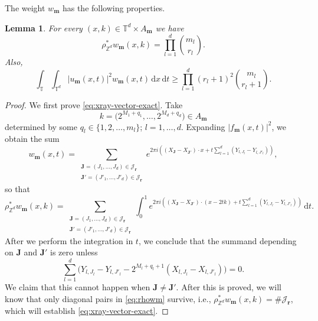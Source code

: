 \documentclass[11pt,reqno]{amsart}
\newtheorem{lemma}[theorem]{Lemma}
\numberwithin{equation}{section}
\newcommand{\dd}{\,\mathrm{d}}
\renewcommand{\ge}{\geqslant}
\begin{document}
The weight $w_{\mathbf{m}}$ has the following properties.

\begin{lemma}\label{lm:dyadic-test-estimates}
For every $(x,k)\in\mathbb{T}^d\times A_{\mathbf{m}}$ we have
\begin{equation}\label{eq:xray-vector-exact}
\rho^{\ast}_{\mathbb{Z}^d}w_{\mathbf{m}}(x,k) = \prod_{l=1}^d\binom{m_l}{r_l}.
\end{equation}
Also,
\begin{equation}\label{eq:numerator-vector-lower}
\int_{\mathbb{T}} \int_{\mathbb{T}^d} |u_{\mathbf{m}}(x,t)|^2 w_{\mathbf{m}}(x,t)\dd x\dd t \ge \prod_{l=1}^d (r_l+1)^2\binom{m_l}{r_l+1}.
\end{equation}
\end{lemma}

\begin{proof}
We first prove \eqref{eq:xray-vector-exact}. Take 
\[ k = \bigl(2^{M_1+q_1},\ldots,2^{M_d+q_d}\bigr)\in A_{\mathbf{m}} \]
determined by some $q_l\in\{1,2,\ldots,m_l\}$; $l=1,\ldots,d$. Expanding $|f_{\mathbf{m}}(x,t)|^2$, we obtain the sum
\[ w_{\mathbf{m}}(x,t) = \sum_{\substack{\mathbf{J}=(J_1,\ldots,J_d)\in\mathcal{J}_{\mathbf{r}} \\ \mathbf{J}'=(J'_1,\ldots,J'_d)\in\mathcal{J}_{\mathbf{r}}}} e^{2\pi i\left((X_{\mathbf{J}}-X_{\mathbf{J}'})\cdot x+ t\sum_{l=1}^d(Y_{l,J_l}-Y_{l,J'_l})\right)}, \]
so that
\begin{equation}\label{eq:rhowm}
\rho^{\ast}_{\mathbb{Z}^d}w_{\mathbf{m}}(x,k) = \sum_{\substack{\mathbf{J}=(J_1,\ldots,J_d)\in\mathcal{J}_{\mathbf{r}} \\ \mathbf{J}'=(J'_1,\ldots,J'_d)\in\mathcal{J}_{\mathbf{r}}}} \int_0^1 e^{2\pi i\left((X_{\mathbf{J}}-X_{\mathbf{J}'})\cdot (x-2tk) + t\sum_{l=1}^d(Y_{l,J_l}-Y_{l,J'_l})\right)} \dd t.
\end{equation}
After we perform the integration in $t$, we conclude that the summand depending on $\mathbf{J}$ and $\mathbf{J}'$ is zero unless
\begin{equation}\label{eq:dyadic-relation0}
\sum_{l=1}^d \bigl(Y_{l,J_l}-Y_{l,J'_l} - 2^{M_l+q_l+1}(X_{l,J_l}-X_{l,J'_l})\bigr) = 0.
\end{equation}
We claim that this cannot happen when $\mathbf{J}\neq\mathbf{J}'$. After this is proved, we will know that only diagonal pairs in \eqref{eq:rhowm} survive, i.e.,
$\rho^{\ast}_{\mathbb{Z}^d}w_{\mathbf{m}}(x,k) = \#\mathcal{J}_{\mathbf{r}}$,
which will establish \eqref{eq:xray-vector-exact}.


\end{proof}
\end{document}
